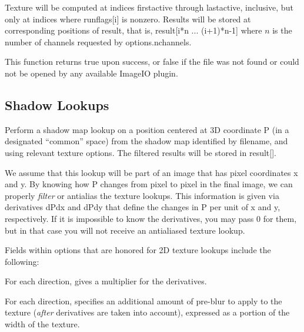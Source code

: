 Texture will be computed at indices {\cf firstactive} through
{\cf lastactive}, inclusive, but only at indices where {\cf runflags[i]}
is nonzero.  Results will be stored at corresponding positions of
{\cf result}, that is, {\cf result[i*n ... (i+1)*n-1]} where $n$ 
is the number of channels requested by {\cf options.nchannels}.

This function returns {\cf true} upon success, or {\cf false} if the
file was not found or could not be opened by any available ImageIO
plugin.
\apiend

\newpage
\subsection{Shadow Lookups}
\label{sec:texturesys:api:shadow}


Perform a shadow map lookup on a position centered at 3D
coordinate {\cf P} (in a designated ``common'' space) from the shadow map identified by
{\cf filename}, and using relevant texture {\cf options}.  The filtered
results will be stored in {\cf result[]}.

We assume that this lookup will be part of an image that has pixel
coordinates {\cf x} and {\cf y}.  By knowing how {\cf P} changes from
pixel to pixel in the final image, we can properly \emph{filter} or
antialias the texture lookups.  This information is given via
derivatives {\cf dPdx} and {\cf dPdy} that define the changes in {\cf P}
per unit of {\cf x} and {\cf y}, respectively.  If it is impossible to
know the derivatives, you may pass 0 for them, but in that case you will
not receive an antialiased texture lookup.

Fields within {\cf options} that are honored for 2D texture lookups
include the following:

\vspace{-12pt}
\vspace{10pt}
For each direction, gives a multiplier for the derivatives.
\apiend

\vspace{-24pt}
\vspace{10pt}
For each direction, specifies an additional amount of pre-blur to apply
to the texture (\emph{after} derivatives are taken into account),
expressed as a portion of the width of the texture.
\apiend

